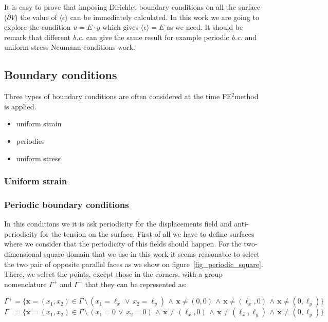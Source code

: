 \documentclass[3p]{elsarticle}
\newcommand{\fe}{FE$^2$}
\begin{document}
It is easy to prove that imposing Dirichlet boundary conditions on all the
surface ($\partial V$) the value of $\langle \epsilon \rangle$ can be
immediately calculated. In this work we are going to explore the condition 
$ u = E \cdot y $ which gives $\langle \epsilon \rangle = E$ as we need. It
should be remark that different \emph{b.c.} can give the same result for example 
periodic \emph{b.c.} and uniform stress Neumann conditions work.

\subsection{Boundary conditions}

Three types of boundary conditions are often considered at the time \fe method is applied. 

\begin{itemize}
\item uniform strain
\item periodics
\item uniform stress
\end{itemize}

\subsubsection{Uniform strain}

\subsubsection{Periodic boundary conditions}

In this conditions we it is ask periodicity for the displacements field and anti-periodicity for the tension on the
surface.
First of all we have to define surfaces where we consider that the periodicity of this fields should happen.
For the two-dimensional square domain that we use in this work it seems reasonable to select the two pair of opposite parallel faces 
as we show on figure~\ref{fig_periodic_square}.
There, we select the points, except those in the corners, with a group nomenclature $\Gamma^+$ and $\Gamma^-$ that they
can be represented as:

\begin{equation}
\Gamma^+ = \{ \bm{x} = (x_1, x_2) \in \Gamma \,\setminus\, (x_1 = \ell_x \,\vee\, x_2 = \ell_y) \,\wedge\,
\bm{x}\neq(0,0) \,\wedge\,  \bm{x}\neq(\ell_x,0) \,\wedge\, \bm{x}\neq(0,\ell_y) \}
\end{equation}
\begin{equation}
\Gamma^- = \{ \bm{x} = (x_1, x_2) \in \Gamma \,\setminus\, (x_1 = 0 \,\vee\, x_2 = 0) \,\wedge\,
  \bm{x}\neq(\ell_x,0) \,\wedge\, \bm{x}\neq(\ell_x,\ell_y) \,\wedge\, \bm{x}\neq(0,\ell_y) \}
\end{equation}
\end{document}
